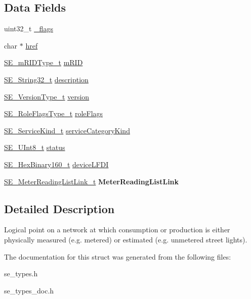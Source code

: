 \subsection*{Data Fields}
\begin{DoxyCompactItemize}
\item 
uint32\+\_\+t \hyperlink{group__UsagePoint_ga22a1651a84bc960921ca4bd34c078437}{\+\_\+flags}
\item 
char $\ast$ \hyperlink{group__UsagePoint_ga43021172f7da501245b4e72b80ee5e75}{href}
\item 
\hyperlink{group__mRIDType_gac74622112f3a388a2851b2289963ba5e}{S\+E\+\_\+m\+R\+I\+D\+Type\+\_\+t} \hyperlink{group__UsagePoint_ga645e59a2bd1f4d5685d14e5df4176b16}{m\+R\+ID}
\item 
\hyperlink{group__String32_gac9f59b06b168b4d2e0d45ed41699af42}{S\+E\+\_\+\+String32\+\_\+t} \hyperlink{group__UsagePoint_ga6ab8b16a8dde1f19d28423dc07615af8}{description}
\item 
\hyperlink{group__VersionType_ga4b8d27838226948397ed99f67d46e2ae}{S\+E\+\_\+\+Version\+Type\+\_\+t} \hyperlink{group__UsagePoint_gaebce20c6df39c9a81d141f4ec08c5b50}{version}
\item 
\hyperlink{group__RoleFlagsType_gac20b70bba5dd7d6773b13d69c372c957}{S\+E\+\_\+\+Role\+Flags\+Type\+\_\+t} \hyperlink{group__UsagePoint_gaa7a0bde02ead6c247119e2e009da01fd}{role\+Flags}
\item 
\hyperlink{group__ServiceKind_ga19a788255c7eeda579474fc6f3cc0810}{S\+E\+\_\+\+Service\+Kind\+\_\+t} \hyperlink{group__UsagePoint_ga5d3e64f099c6fee8452abdfa1fce6cb2}{service\+Category\+Kind}
\item 
\hyperlink{group__UInt8_gaf7c365a1acfe204e3a67c16ed44572f5}{S\+E\+\_\+\+U\+Int8\+\_\+t} \hyperlink{group__UsagePoint_gad92c2e2bb45df1e0967e40cfb59d1454}{status}
\item 
\hyperlink{group__HexBinary160_ga92b92aa55555bdb75f3a59060f2c1632}{S\+E\+\_\+\+Hex\+Binary160\+\_\+t} \hyperlink{group__UsagePoint_gafb00c05d7c38ea87e94b837d5712ac0b}{device\+L\+F\+DI}
\item 
\hyperlink{structSE__MeterReadingListLink__t}{S\+E\+\_\+\+Meter\+Reading\+List\+Link\+\_\+t} {\bfseries Meter\+Reading\+List\+Link}
\end{DoxyCompactItemize}


\subsection{Detailed Description}
Logical point on a network at which consumption or production is either physically measured (e.\+g. metered) or estimated (e.\+g. unmetered street lights). 

The documentation for this struct was generated from the following files\+:\begin{DoxyCompactItemize}
\item 
se\+\_\+types.\+h\item 
se\+\_\+types\+\_\+doc.\+h\end{DoxyCompactItemize}
